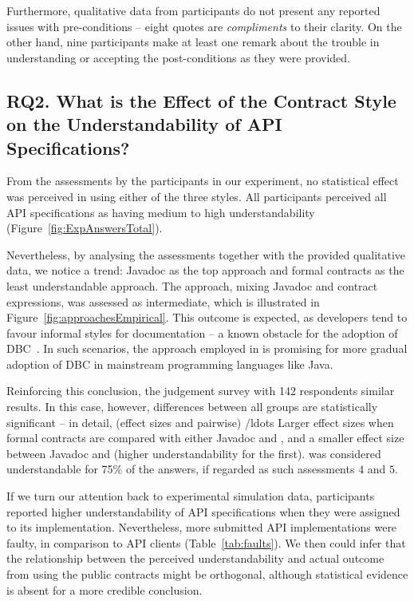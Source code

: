 Furthermore, qualitative data from participants do not present any reported issues with pre-conditions -- eight quotes are \emph{compliments} to their clarity. On the other hand, nine participants make at least one remark about the trouble in understanding or accepting the post-conditions as they were provided.


\subsection{RQ2. What is the Effect of the Contract Style on the Understandability of API Specifications?}
\label{rq2}

From the assessments by the participants in our experiment, no statistical effect was perceived in using either of the three styles. All participants perceived all API specifications as having medium to high understandability (Figure~\ref{fig:ExpAnswersTotal}). 

Nevertheless, by analysing the assessments together with the provided qualitative data, we notice a trend: Javadoc as the top approach and formal contracts as the least understandable approach. The \contractjdoc{} approach, mixing Javadoc and contract expressions, was assessed as intermediate, which is illustrated in Figure~\ref{fig:approachesEmpirical}.
This outcome is expected, as developers tend to favour informal styles for documentation -- a known obstacle for the adoption of DBC~\cite{Polikarpova-etal09}. In such scenarios, the approach employed in \contractjdoc{} is promising for more gradual adoption of DBC in mainstream programming languages like Java.

Reinforcing this conclusion, the judgement survey with 142 respondents similar results. 
In this case, however, differences between all groups are statistically significant -- in detail, (effect sizes and pairwise) /ldots
Larger effect sizes when formal contracts are compared with either Javadoc and \contractjdoc{}, and a smaller effect size between Javadoc and \contractjdoc{} (higher understandability for the first).
\contractjdoc{} was considered understandable for 75\% of the answers, if regarded as such assessments $4$ and $5$.

If we turn our attention back to experimental simulation data, participants reported higher understandability of API specifications when they were assigned to its implementation. Nevertheless, more submitted API implementations were faulty, in comparison to API clients (Table~\ref{tab:faults}). 
We then could infer that the relationship between the perceived understandability and actual outcome from using the public contracts might be orthogonal, although statistical evidence is absent for a more credible conclusion. 


